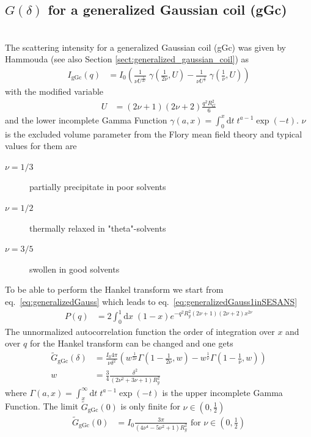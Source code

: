 \subsection{$G(\delta)$ for a generalized Gaussian coil (gGc) }~\\
\label{sec:Gz_gGc}
The scattering intensity for a generalized Gaussian coil (gGc) was given by Hammouda \cite{Hammouda,Hammouda2012,Hammouda1993,Hammouda2016} (see also Section \ref{sect:generalized_gaussian_coil}) as
\begin{align}
I_\text{gGc}(q) &= I_0
\left(
\frac{1}{\nu U^{\frac{1}{2 \nu}}} \; \gamma\left(\frac{1}{2 \nu},U\right)-
\frac{1}{\nu U^{\frac{1}{  \nu}}} \; \gamma\left(\frac{1}{  \nu},U\right)
\right)
\label{eq:generalizedGauss1inSESANS}
\end{align}
with the modified variable
\begin{align}
U&= \left(2\nu+1\right)\left(2\nu+2\right)\frac{q^2R_G^2}{6}
\end{align}
and the lower incomplete Gamma Function $\gamma(a,x) = \int_0^x \mathrm{d}t \; t^{a-1} \exp(-t)$.
$\nu$ is the excluded volume parameter from the Flory mean field theory and typical values for them are
\begin{description}
\item[$\nu=1/3$] partially precipitate in poor solvents
\item[$\nu=1/2$] thermally relaxed in "theta"-solvents
\item[$\nu=3/5$] swollen in good solvents
\end{description}
To be able to perform the Hankel transform we start from eq.\ \ref{eq:generalizedGauss} which leads to eq.\ \ref{eq:generalizedGauss1inSESANS}
\begin{align}
P(q) &= 2\int_0^1 \mathrm{d}x \; (1-x)e^{-q^2R_g^2(2\nu+1)(2\nu+2)x^{2\nu}}
\label{eq:generalizedGaussinSESANS}
\end{align}
The unnormalized autocorrelation function the order of integration over $x$ and  over $q$ for the Hankel transform can be changed and one gets
\begin{align}
\tilde{G}_\mathrm{gGc}(\delta) &=
 \frac{I_0 4\pi}{\nu \delta^2} \left(
   w^{\frac{1}{2\nu}} \Gamma \left(1-\frac{1}{2 \nu },w\right) - w^{\frac{1}{\nu }} \Gamma \left(1-\frac{1}{\nu },w\right) \right) \label{eq:Gz_gGc}\\
   w &= \frac34 \frac{\delta^2}{\left(2 \nu ^2+3 \nu +1\right) R_g^2}
\end{align}
where $\Gamma(a,x) = \int_x^\infty \mathrm{d}t \; t^{a-1} \exp(-t)$ is the upper incomplete Gamma Function.
The limit $\tilde{G}_\mathrm{gGc}(0)$ is only finite for $\nu \in \left(0,\frac12\right)$
\begin{align}
\tilde{G}_\mathrm{gGc}(0) &= I_0 \frac{3 \pi }{\left(4 \nu ^4-5 \nu ^2+1\right) R_g^2} \mbox{~for~} \nu \in \left(0,\frac12\right) \label{eq:G0_gGc}
\end{align}

